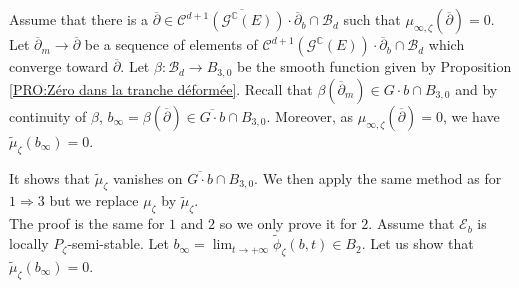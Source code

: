 \documentclass{article}
\theoremstyle{remark}
\theoremstyle{definition}
\newcommand{\C}{\mathbb{C}}
\newcommand{\E}{\mathcal{E}}
\newcommand{\G}{\mathcal{G}}
\newcommand{\mB}{\mathcal{B}}
\newcommand{\mC}{\mathcal{C}}
\newcommand{\dbar}{\overline{\partial}}
\begin{document}
\noindent{} Assume that there is a $\dbar \in \overline{\mC^{d + 1}(\G^\C(E)) \cdot \dbar_b} \cap \mB_d$ such that $\mu_{\infty,\zeta}(\dbar) = 0$. Let $\dbar_m \rightarrow \dbar$ be a sequence of elements of $\mC^{d + 1}(\G^\C(E)) \cdot \dbar_b \cap \mB_d$ which converge toward $\dbar$. Let $\beta : \mB_d \rightarrow B_{3,0}$ be the smooth function given by Proposition \ref{PRO:Zéro dans la tranche déformée}. Recall that $\beta(\dbar_m) \in G \cdot b \cap B_{3,0}$ and by continuity of $\beta$, $b_\infty = \beta(\dbar) \in \overline{G \cdot b} \cap B_{3,0}$. Moreover, as $\mu_{\infty,\zeta}(\dbar) = 0$, we have $\tilde{\mu}_\zeta(b_\infty) = 0$.

It shows that $\tilde{\mu}_\zeta$ vanishes on $\overline{G \cdot b} \cap B_{3,0}$. We then apply the same method as for $1 \Rightarrow 3$ but we replace $\mu_\zeta$ by $\tilde{\mu}_\zeta$.\\

\noindent{} The proof is the same for $1$ and $2$ so we only prove it for $2$. Assume that $\E_b$ is locally $P_\zeta$-semi-stable. Let $b_\infty = \lim_{t \rightarrow +\infty} \tilde{\phi}_\zeta(b,t) \in B_2$. Let us show that $\tilde{\mu}_\zeta(b_\infty) = 0$.
\end{document}
